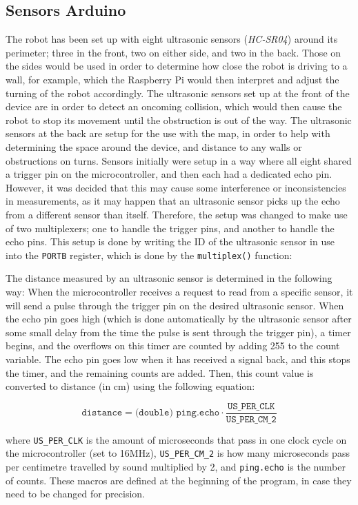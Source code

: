 \documentclass[11pt]{article}
\begin{document}
\subsection*{Sensors Arduino}
The robot has been set up with eight ultrasonic sensors (\textit{HC-SR04}) around its perimeter; three in the front, two on either side, and two in the back. Those on the sides would be used in order to determine how close the robot is driving to a wall, for example, which the Raspberry Pi would then interpret and adjust the turning of the robot accordingly. The ultrasonic sensors set up at the front of the device are in order to detect an oncoming collision, which would then cause the robot to stop its movement until the obstruction is out of the way. The ultrasonic sensors at the back are setup for the use with the map, in order to help with determining the space around the device, and distance to any walls or obstructions on turns. Sensors initially were setup in a way where all eight shared a trigger pin on the microcontroller, and then each had a dedicated echo pin. However, it was decided that this may cause some interference or inconsistencies in measurements, as it may happen that an ultrasonic sensor picks up the echo from a different sensor than itself. Therefore, the setup was changed to make use of two multiplexers; one to handle the trigger pins, and another to handle the echo pins. This setup is done by writing the ID of the ultrasonic sensor in use into the \texttt{PORTB} register, which is done by the \texttt{multiplex()} function:



The distance measured by an ultrasonic sensor is determined in the following way: When the microcontroller receives a request to read from a specific sensor, it will send a pulse through the trigger pin on the desired ultrasonic sensor. When the echo pin goes high (which is done automatically by the ultrasonic sensor after some small delay from the time the pulse is sent through the trigger pin), a timer begins, and the overflows on this timer are counted by adding 255 to the count variable. The echo pin goes low when it has received a signal back, and this stops the timer, and the remaining counts are added. Then, this count value is converted to distance (in cm) using the following equation:

$$\texttt{distance} = \texttt{(double) ping.echo}\cdot\frac{\texttt{US\_PER\_CLK}}{\texttt{US\_PER\_CM\_2}}$$

where \texttt{US\_PER\_CLK} is the amount of microseconds that pass in one clock cycle on the microcontroller (set to 16MHz), \texttt{US\_PER\_CM\_2} is how many microseconds pass per centimetre travelled by sound multiplied by 2, and \texttt{ping.echo} is the number of counts. These macros are defined at the beginning of the program, in case they need to be changed for precision.
\end{document}
